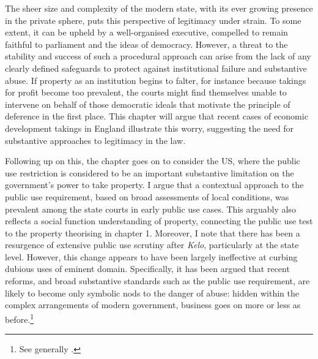 The sheer size and complexity of the modern state, with its ever growing presence in the private sphere, puts this perspective of legitimacy under strain. To some extent, it can be upheld by a well-organised executive, compelled to remain faithful to parliament and the ideas of democracy. However, a threat to the stability and success of such a procedural approach can arise from the lack of any clearly defined safeguards to protect against institutional failure and substantive abuse. If property as an institution begins to falter, for instance because takings for profit become too prevalent, the courts might find themselves unable to intervene on behalf of those democratic ideals that motivate the principle of deference in the first place. This chapter will argue that recent cases of economic development takings in England illustrate this worry, suggesting the need for substantive approaches to legitimacy in the law.

Following up on this, the chapter goes on to consider the US, where the public use restriction is considered to be an important substantive limitation on the government's power to take property. I argue that a contextual approach to the public use requirement, based on broad assessments of local conditions, was prevalent among the state courts in early public use cases. This arguably also reflects a social function understanding of property, connecting the public use test to the property theorising in chapter 1. Moreover, I note that there has been a resurgence of extensive public use scrutiny after {\it Kelo}, particularly at the state level. However, this change appears to have been largely ineffective at curbing dubious uses of eminent domain. Specifically, it has been argued that recent reforms, and broad substantive standards such as the public use requirement, are likely to become only symbolic nods to the danger of abuse: hidden within the complex arrangements of modern government, business goes on more or less as before.\footnote{See generally \cite{somin09}.}


